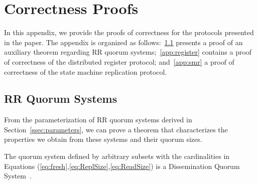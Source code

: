 \chapter{Correctness Proofs}\label{chapter:appendixA}

In this appendix, we provide the proofs of correctness for the
protocols presented in the paper. The appendix is organized as
follows:~\ref{app:quorum} presents a proof of an auxiliary
theorem regarding \ac{RR} quorum systems;~\ref{app:register}
contains a proof of correctness of the distributed register
protocol; and~\ref{app:smr} a proof of correctness of the state
machine replication protocol.

\section{\ac{RR} Quorum Systems}\label{app:quorum}

From the parameterization of \ac{RR} quorum systems derived
in Section~\ref{ssec:parameters}, we can prove a theorem that
characterizes the properties we obtain from these systems and
their quorum sizes.

\begin{theorem}\label{thrmQ}
  The quorum system defined by arbitrary subsets with the
    cardinalities in Equations
    (\ref{eq:fresh},\ref{eq:ReplSize},\ref{eq:ReadSize}) is a
    Dissemination Quorum System~\cite{Malkhi:Reiter:BQS:98}.
\end{theorem}

